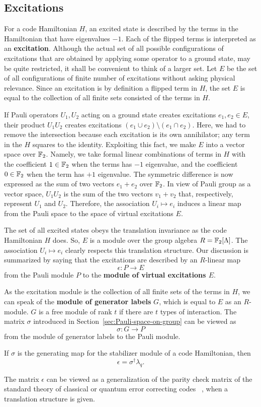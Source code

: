 \subsection{Excitations}

For a code Hamiltonian $H$,
an excited state is described by the terms in the Hamiltonian that have eigenvalues $-1$.
Each of the flipped terms is interpreted as an {\bf excitation}.
Although the actual set of all possible configurations of excitations
that are obtained by applying some operator to a ground state, may be quite restricted,
it shall be convenient to think of a larger set.
Let $E$ be the set of all configurations of finite number of excitations without asking physical relevance.
Since an excitation is by definition a flipped term in $H$,
the set $E$ is equal to the collection of all finite sets consisted of the terms in $H$.

If Pauli operators $U_1, U_2$ acting on a ground state creates excitations $e_1, e_2 \in E$,
their product $U_1 U_2$ creates excitations $(e_1 \cup e_2) \setminus (e_1 \cap e_2)$.
Here, we had to remove the intersection because each excitation is its own annihilator;
any term in the $H$ squares to the identity.
Exploiting this fact, we make $E$ into a vector space over $\mathbb{F}_2$.
Namely, we take formal linear combinations of terms in $H$
with the coefficient $1 \in \mathbb{F}_2$ when the terms has $-1$ eigenvalue,
and the coefficient $0 \in \mathbb{F}_2$ when the term has $+1$ eigenvalue.
The symmetric difference is now expressed as the sum of two vectors $e_1 + e_2$ over $\mathbb{F}_2$.
In view of Pauli group as a vector space,
$U_1 U_2$ is the sum of the two vectors $v_1 + v_2$ that, respectively, represent $U_1$ and $U_2$.
Therefore, the association $U_i \mapsto e_i$ induces 
a linear map from the Pauli space to the space of virtual excitations $E$.

The set of all excited states obeys the translation invariance as the code Hamiltonian $H$ does.
So, $E$ is a module over the group algebra $R=\mathbb{F}_2[\Lambda]$.
The association $U_i \mapsto e_i$ clearly respects this translation structure.
Our discussion is summarized by saying that the excitations are described by an $R$-linear map
\[
 \epsilon : P \to E
\]
from the Pauli module $P$ to the {\bf module of virtual excitations $E$}.

As the excitation module is the collection of all finite sets of the terms in $H$,
we can speak of the {\bf module of generator labels} $G$,
which is equal to $E$ as an $R$-module.
$G$ is a free module of rank $t$ if there are $t$ types of interaction.
The matrix $\sigma$ introduced in Section~\ref{sec:Pauli-space-on-group} can be viewed as
\[
 \sigma : G \to P
\]
from the module of generator labels to the Pauli module.
\begin{prop}
If $\sigma$ is the generating map for the stabilizer module of a code Hamiltonian,
then 
\[
 \epsilon = \sigma^\dagger \lambda_q .
\]
\end{prop}
The matrix $\epsilon$ can be viewed as a generalization of
the parity check matrix of the standard theory of classical or quantum error correcting codes%
~\cite{MacWilliamsSloane1977,CalderbankShor1996Good,Steane1996Multiple,Gottesman1996Saturating},
when a translation structure is given.

